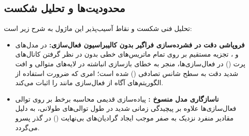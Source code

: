 \subsection{محدودیت‌ها و تحلیل شکست}
تحلیل فنی شکست و نقاط آسیب‌پذیر این ماژول به شرح زیر است:
\begin{itemize}
    \item \textbf{فروپاشی دقت در فشرده‌سازی فراگیر بدون کالیبراسیون فعال‌سازی:} در مدل‌های  و ، تجزیه مستقیم  بر روی تمام ماتریس‌های خطی بدون در نظر گرفتن کانال‌های پرت () در فعال‌سازی‌ها، منجر به خطای بازسازی انباشته در لایه‌های متوالی و افت شدید دقت به سطح شانس تصادفی () شده است؛ امری که ضرورت استفاده از الگوریتم‌های آگاه از فعال‌سازی مانند  را اثبات می‌کند.
    \item \textbf{ناسازگاری مدل منسوخ :} پیاده‌سازی قدیمی محاسبه برخط  بر روی توالی فعال‌سازی‌ها علاوه بر پیچیدگی زمانی شدید در طول توالی‌های طولانی، به دلیل مقادیر منفرد نزدیک به صفر موجب ایجاد گرادیان‌های بی‌نهایت () در گذر پسرو می‌گردد.
\end{itemize}

